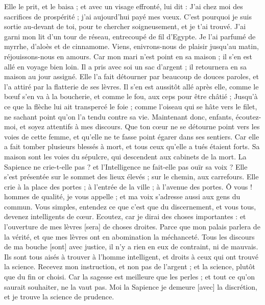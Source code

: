 \begin{multicols}{2}
Elle le prit, et le baisa ; et avec un visage effronté, lui dit :
J'ai chez moi des sacrifices de prospérité ; j'ai aujourd'hui payé mes vœux.
C'est pourquoi je suis sortie au-devant de toi, pour te chercher soigneusement, et je t'ai trouvé.
J'ai garni mon lit d'un tour de réseau, entrecoupé de fil d'Egypte.
Je l'ai parfumé de myrrhe, d'aloès et de cinnamome.
Viens, enivrons-nous de plaisir jusqu'au matin, réjouissons-nous en amours.
Car mon mari n'est point en sa maison ; il s'en est allé en voyage bien loin.
Il a pris avec soi un sac d'argent ; il retournera en sa maison au jour assigné.
Elle l'a fait détourner par beaucoup de douces paroles, et l'a attiré par la flatterie de ses lèvres.
Il s'en est aussitôt allé après elle, comme le bœuf s'en va à la boucherie, et comme le fou, aux ceps pour être châtié ;
Jusqu'à ce que la flèche lui ait transpercé le foie ; comme l'oiseau qui se hâte vers le filet, ne sachant point qu'on l'a tendu contre sa vie.
Maintenant donc, enfants, écoutez-moi, et soyez attentifs à mes discours.
Que ton cœur ne se détourne point vers les voies de cette femme, et qu'elle ne te fasse point égarer dans ses sentiers.
Car elle a fait tomber plusieurs blessés à mort, et tous ceux qu'elle a tués étaient forts.
Sa maison sont les voies du sépulcre, qui descendent aux cabinets de la mort.
\VerseOne{}La Sapience ne crie-t-elle pas ? et l'Intelligence ne fait-elle pas ouïr sa voix ?
Elle s'est présentée sur le sommet des lieux élevés ; sur le chemin, aux carrefours.
Elle crie à la place des portes ; à l'entrée de la ville ; à l'avenue des portes.
Ô vous ! hommes de qualité, je vous appelle ; et ma voix s'adresse aussi aux gens du commun.
Vous simples, entendez ce que c'est que du discernement, et vous tous, devenez intelligents de cœur.
Ecoutez, car je dirai des choses importantes : et l'ouverture de mes lèvres [sera] de choses droites.
Parce que mon palais parlera de la vérité, et que mes lèvres ont en abomination la méchanceté.
Tous les discours de ma bouche [sont] avec justice, il n'y a rien en eux de contraint, ni de mauvais.
Ils sont tous aisés à trouver à l'homme intelligent, et droits à ceux qui ont trouvé la science.
Recevez mon instruction, et non pas de l'argent ; et la science, plutôt que du fin or choisi.
Car la sagesse est meilleure que les perles ; et tout ce qu'on saurait souhaiter, ne la vaut pas.
Moi la Sapience je demeure [avec] la discrétion, et je trouve la science de prudence.

\end{multicols}
